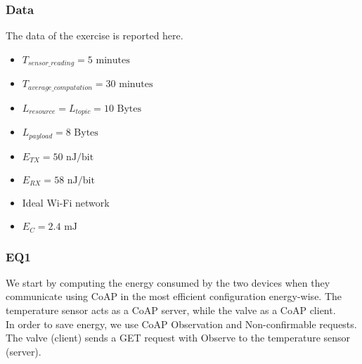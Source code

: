 \subsubsection{Data}

The data of the exercise is reported here.
\begin{itemize}
	\item $T_{sensor\_reading} = 5 \text{ minutes}$
	\item $T_{average\_computation} = 30 \text{ minutes}$
	\item $L_{resource} = L_{topic} = 10  \text{ Bytes}$
	\item $L_{payload} = 8  \text{ Bytes}$
	\item $E_{TX} = 50 \text{ nJ/bit}$
	\item $E_{RX} = 58 \text{ nJ/bit}$
	\item Ideal Wi-Fi network 
	\item $E_{C} = 2.4 \text{ mJ}$
\end{itemize}

\subsubsection{EQ1}
We start by computing the energy consumed by the two devices when they communicate using CoAP in the most efficient configuration energy-wise. The temperature sensor acts as a CoAP server, while the valve as a CoAP client.\\
In order to save energy, we use CoAP Observation and Non-confirmable requests. The valve (client) sends a GET request with Observe to the temperature sensor (server). 
